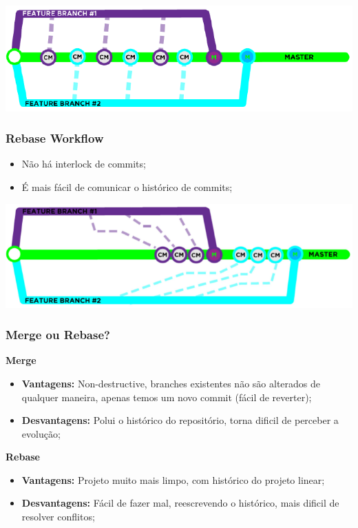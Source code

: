 \documentclass{article}
\begin{document}
\begin{center}
  \includegraphics[scale=0.6]{53}
\end{center}

\subsubsection{Rebase Workflow}

\begin{itemize}
  \item Não há interlock de commits;
  \item É mais fácil de comunicar o histórico de commits;
\end{itemize}

\begin{center}
  \includegraphics[scale=0.6]{54}
\end{center}

\subsubsection{Merge ou Rebase?}

\begin{flushleft}
  \textbf{Merge}
  \begin{itemize}
    \item \textbf{Vantagens:} Non-destructive, branches existentes não são
    alterados de qualquer maneira, apenas temos um novo commit (fácil de reverter);
    \item \textbf{Desvantagens:} Polui o histórico do repositório, torna dificil
    de perceber a evolução;
  \end{itemize}

  \textbf{Rebase}
  \begin{itemize}
    \item \textbf{Vantagens:} Projeto muito mais limpo, com histórico do projeto linear;
    \item \textbf{Desvantagens:} Fácil de fazer mal, reescrevendo o histórico, mais dificil de resolver conflitos;
  \end{itemize}
\end{flushleft}
\end{document}
